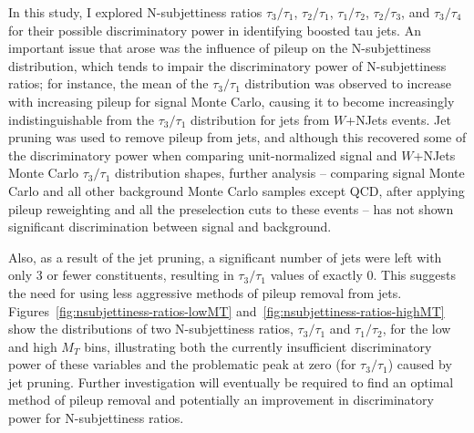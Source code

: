 In this study, I explored N-subjettiness ratios $\tau_{3}/\tau_{1}$, $\tau_{2}/\tau_{1}$, $\tau_{1}/\tau_{2}$, $\tau_{2}/\tau_{3}$, and $\tau_{3}/\tau_{4}$ for their possible discriminatory power in identifying boosted tau jets. An important issue that arose was the influence of pileup on the N-subjettiness distribution, which tends to impair the discriminatory power of N-subjettiness ratios; for instance, the mean of the $\tau_{3}/\tau_{1}$ distribution was observed to increase with increasing pileup for signal Monte Carlo, causing it to become increasingly indistinguishable from the $\tau_{3}/\tau_{1}$ distribution for jets from $W$+NJets events. Jet pruning was used to remove pileup from jets, and although this recovered some of the discriminatory power when comparing unit-normalized signal and $W$+NJets Monte Carlo $\tau_{3}/\tau_{1}$ distribution shapes, further analysis -- comparing signal Monte Carlo and all other background Monte Carlo samples except QCD, after applying pileup reweighting and all the preselection cuts to these events -- has not shown significant discrimination between signal and background.

Also, as a result of the jet pruning, a significant number of jets were left with only 3 or fewer constituents, resulting in $\tau_{3}/\tau_{1}$ values of exactly 0. This suggests the need for using less aggressive methods of pileup removal from jets. Figures~\ref{fig:nsubjettiness-ratios-lowMT} and~\ref{fig:nsubjettiness-ratios-highMT} show the distributions of two N-subjettiness ratios, $\tau_{3}/\tau_{1}$ and $\tau_{1}/\tau_{2}$, for the low and high $M_{T}$ bins, illustrating both the currently insufficient discriminatory power of these variables and the problematic peak at zero (for $\tau_{3}/\tau_{1}$) caused by jet pruning. Further investigation will eventually be required to find an optimal method of pileup removal and potentially an improvement in discriminatory power for N-subjettiness ratios.

